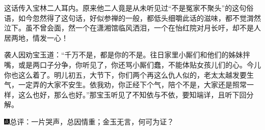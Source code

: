 这话传入宝林二人耳内。原来他二人竟是从未听见过``不是冤家不聚头''的这句俗语，如今忽然得了这句话，好似参禅的一般，都低头细嚼此话的滋味，都不觉潸然泣下。虽不曾会面，然一个在潇湘馆临风洒泪，一个在怡红院对月长吁，却不是人居两地，情发一心！

袭人因劝宝玉道：``千万不是，都是你的不是。往日家里小厮们和他们的姊妹拌嘴，或是两口子分争，你听见了，你还骂小厮们蠢，不能体贴女孩儿们的心。今儿你也这么着了。明儿初五，大节下，你们两个再这么仇人似的，老太太越发要生气，一定弄的大家不安生。依我劝，你正经下个气，陪个不是，大家还是照常一样，这么也好，那么也好。''那宝玉听见了不知依与不依，要知端详，且听下回分解。

{\includegraphics[width=3mm]{../Images/00005}总评：一片哭声，总因情重；金玉无言，何可为证？}
